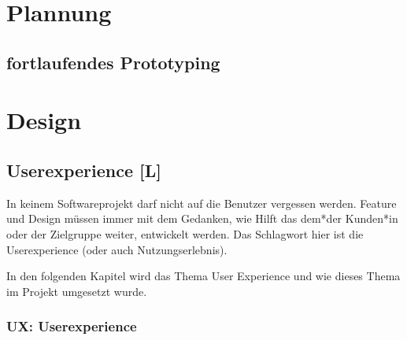 \section{Plannung}
\subsection{fortlaufendes Prototyping}
\label{ch::ongoing-prototyping}

\section{Design}
\subsection{Userexperience [L]}

In keinem Softwareprojekt darf nicht auf die Benutzer vergessen werden. Feature und Design müssen immer mit dem Gedanken, wie Hilft das dem*der Kunden*in oder der Zielgruppe weiter, entwickelt werden. Das Schlagwort hier ist die Userexperience (oder auch Nutzungserlebnis).

In den folgenden Kapitel wird das Thema User Experience und wie dieses Thema im Projekt umgesetzt wurde. 

\subsubsection{UX: Userexperience}
